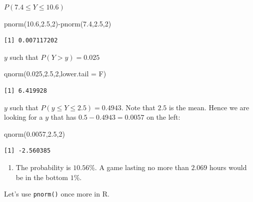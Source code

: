 \documentclass[
  letterpaper,
  DIV=11,
  numbers=noendperiod]{scrreprt}
\newenvironment{Shaded}{\begin{snugshade}}{\end{snugshade}}
\newcommand{\AttributeTok}[1]{\textcolor[rgb]{0.40,0.45,0.13}{#1}}
\newcommand{\DecValTok}[1]{\textcolor[rgb]{0.68,0.00,0.00}{#1}}
\newcommand{\FloatTok}[1]{\textcolor[rgb]{0.68,0.00,0.00}{#1}}
\newcommand{\FunctionTok}[1]{\textcolor[rgb]{0.28,0.35,0.67}{#1}}
\newcommand{\NormalTok}[1]{\textcolor[rgb]{0.00,0.23,0.31}{#1}}
\newcommand{\SpecialCharTok}[1]{\textcolor[rgb]{0.37,0.37,0.37}{#1}}
\providecommand{\tightlist}{%
  \setlength{\itemsep}{0pt}\setlength{\parskip}{0pt}}\usepackage{longtable,booktabs,array}
\begin{document}
\(P(7.4 \leq Y \leq 10.6)\)

\begin{Shaded}
\begin{Highlighting}[numbers=left,,]
\FunctionTok{pnorm}\NormalTok{(}\FloatTok{10.6}\NormalTok{,}\FloatTok{2.5}\NormalTok{,}\DecValTok{2}\NormalTok{)}\SpecialCharTok{{-}}\FunctionTok{pnorm}\NormalTok{(}\FloatTok{7.4}\NormalTok{,}\FloatTok{2.5}\NormalTok{,}\DecValTok{2}\NormalTok{)}
\end{Highlighting}
\end{Shaded}

\begin{verbatim}
[1] 0.007117202
\end{verbatim}

\(y\) such that \(P(Y>y)=0.025\)

\begin{Shaded}
\begin{Highlighting}[numbers=left,,]
\FunctionTok{qnorm}\NormalTok{(}\FloatTok{0.025}\NormalTok{,}\FloatTok{2.5}\NormalTok{,}\DecValTok{2}\NormalTok{,}\AttributeTok{lower.tail =}\NormalTok{ F)}
\end{Highlighting}
\end{Shaded}

\begin{verbatim}
[1] 6.419928
\end{verbatim}

\(y\) such that \(P(y \leq Y \leq 2.5)=0.4943\). Note that \(2.5\) is
the mean. Hence we are looking for a \(y\) that has
\(0.5-0.4943=0.0057\) on the left:

\begin{Shaded}
\begin{Highlighting}[numbers=left,,]
\FunctionTok{qnorm}\NormalTok{(}\FloatTok{0.0057}\NormalTok{,}\FloatTok{2.5}\NormalTok{,}\DecValTok{2}\NormalTok{)}
\end{Highlighting}
\end{Shaded}

\begin{verbatim}
[1] -2.560385
\end{verbatim}

\begin{enumerate}
\def\labelenumi{\arabic{enumi}.}
\setcounter{enumi}{2}
\tightlist
\item
  The probability is \(10.56\)\%. A game lasting no more than \(2.069\)
  hours would be in the bottom \(1\)\%.
\end{enumerate}

Let's use \texttt{pnorm()} once more in R.
\end{document}

